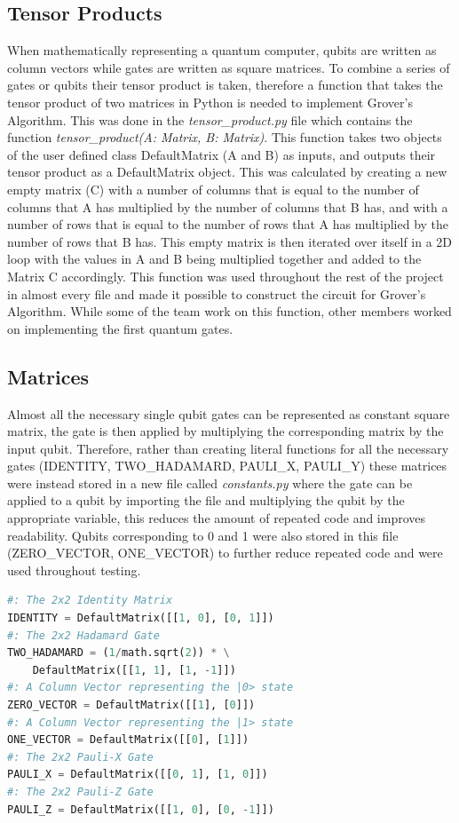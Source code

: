 \documentclass{article}
\begin{document}
\subsection{Tensor Products}
When mathematically representing a quantum computer, qubits are written as column vectors while gates are written as square matrices. To combine a series of gates or qubits their tensor product is taken, therefore a function that takes the tensor product of two matrices in Python is needed to implement Grover's Algorithm. This was done in the \textit{tensor\_product.py} file which contains the function \textit{tensor\_product(A: Matrix, B: Matrix)}. This function takes two objects of the user defined class DefaultMatrix (A and B) as inputs, and outputs their tensor product as a DefaultMatrix object. This was calculated by creating a new empty matrix (C) with a number of columns that is equal to the number of columns that A has multiplied by the number of columns that B has, and with a number of rows that is equal to the number of rows that A has multiplied by the number of rows that B has. This empty matrix is then iterated over itself in a 2D loop with the values in A and B being multiplied together and added to the Matrix C accordingly. This function was used throughout the rest of the project in almost every file and made it possible to construct the circuit for Grover's Algorithm. While some of the team work on this function, other members worked on implementing the first quantum gates.

\subsection{Matrices}
Almost all the necessary single qubit gates can be represented as constant square matrix, the gate is then applied by multiplying the corresponding matrix by the input qubit. Therefore, rather than creating literal functions for all the necessary gates (IDENTITY, TWO\_HADAMARD, PAULI\_X, PAULI\_Y) these matrices were instead stored in a new file called \textit{constants.py} where the gate can be applied to a qubit by importing the file and multiplying the qubit by the appropriate variable, this reduces the amount of repeated code and improves readability. Qubits corresponding to 0 and 1 were also stored in this file (ZERO\_VECTOR, ONE\_VECTOR) to further reduce repeated code and were used throughout testing. 

\begin{file}[constants.py]
\begin{lstlisting}[language=Python]
#: The 2x2 Identity Matrix
IDENTITY = DefaultMatrix([[1, 0], [0, 1]])
#: The 2x2 Hadamard Gate
TWO_HADAMARD = (1/math.sqrt(2)) * \
	DefaultMatrix([[1, 1], [1, -1]])
#: A Column Vector representing the |0> state
ZERO_VECTOR = DefaultMatrix([[1], [0]])
#: A Column Vector representing the |1> state
ONE_VECTOR = DefaultMatrix([[0], [1]])
#: The 2x2 Pauli-X Gate
PAULI_X = DefaultMatrix([[0, 1], [1, 0]])
#: The 2x2 Pauli-Z Gate
PAULI_Z = DefaultMatrix([[1, 0], [0, -1]])

\end{lstlisting}
\end{file}
\end{document}

